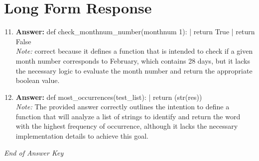 \documentclass[12pt]{article}
\begin{document}
\section*{Long Form Response}
\begin{enumerate}[label=\arabic*.]
\setcounter{enumi}{10}
\item \textbf{Answer:} def check\_monthnum\_number(monthnum 1): | return True | return False
\\ \textit{Note:} correct because it defines a function that is intended to check if a given month number corresponds to February, which contains 28 days, but it lacks the necessary logic to evaluate the month number and return the appropriate boolean value.
\item \textbf{Answer:} def most\_occurrences(test\_list): | return (str(res))
\\ \textit{Note:} The provided answer correctly outlines the intention to define a function that will analyze a list of strings to identify and return the word with the highest frequency of occurrence, although it lacks the necessary implementation details to achieve this goal.
\end{enumerate}

\vfill
\noindent\textit{End of Answer Key}
\end{document}
